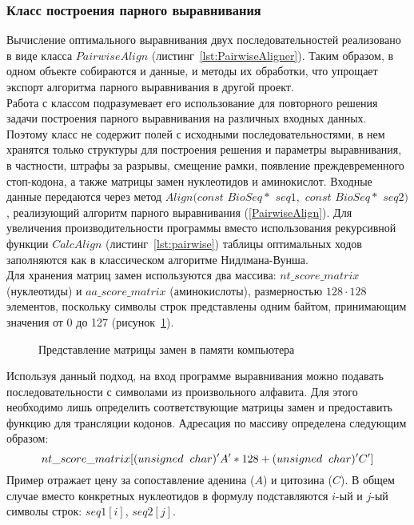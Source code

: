 \subsubsection[Класс построения парного выравнивания]{\large Класс построения парного выравнивания}
\hspace{\parindent} Вычисление оптимального выравнивания двух последовательностей реализовано в виде класса $PairwiseAlign$ (листинг~\ref{lst:PairwiseAligner}). Таким образом, в одном объекте собираются и данные, и методы их обработки, что упрощает экспорт алгоритма парного выравнивания в другой проект.\\
\indent Работа с классом подразумевает его использование для повторного решения задачи построения парного выравнивания на различных входных данных. Поэтому класс не содержит полей с исходными последовательностями, в нем хранятся только структуры для построения решения и параметры выравнивания, в частности, штрафы за разрывы, смещение рамки, появление преждевременного стоп-кодона, а также матрицы замен нуклеотидов и аминокислот. Входные данные передаются через метод $Align(const$ $BioSeq*$ $seq1,$ $const$ $BioSeq*$ $seq2)$, реализующий алгоритм парного выравнивания (\ref{PairwiseAlign}). Для увеличения производительности программы вместо использования рекурсивной функции $CalcAlign$ (листинг~\ref{lst:pairwise}) таблицы оптимальных ходов заполняются как в классическом алгоритме Нидлмана-Вунша.\\
\indent Для хранения матриц замен используются два массива: $nt\_score\_matrix$ (нуклеотиды) и $aa\_score\_matrix$ (аминокислоты), размерностью $128\cdot 128$ элементов, поскольку символы строк представлены одним байтом, принимающим значения от 0 до 127 (рисунок~\ref{ris:memory}).
\begin{figure}[H]
	\caption{Представление матрицы замен в памяти компьютера}
	\label{ris:memory}
\end{figure}
\indent Используя данный подход, на вход программе выравнивания можно подавать последовательности с символами из произвольного алфавита. Для этого необходимо лишь определить соответствующие матрицы замен и предоставить функцию для трансляции кодонов. Адресация по массиву определена следующим образом:
\begin{equation*}
nt\_score\_matrix[(unsigned\hspace{0.2cm} char)'A'*128+(unsigned\hspace{0.2cm} char)'C']
\end{equation*}
Пример отражает цену за сопоставление аденина ($A$) и цитозина ($C$). В общем случае вместо конкретных нуклеотидов в формулу подставляются $i$-ый и $j$-ый символы строк: $seq1[i]$, $seq2[j]$.

